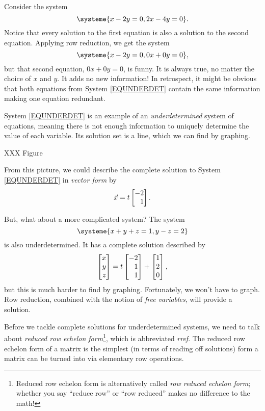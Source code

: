 	Consider the system
	\begin{equation}
		\label{EQUNDERDET}
		\systeme{x-2y=0,2x-4y=0}.
	\end{equation}
	Notice that every solution to the first equation is also a solution to the second equation.
	Applying row reduction, we get the system
	\[
		\systeme{x-2y=0,0x+0y=0},
	\]
	but that second equation, $0x+0y=0$, is funny. It is always true, no matter the choice of $x$ and $y$.
	It adds no new information! In retrospect, it might be obvious that both equations from System \eqref{EQUNDERDET}
	contain the same information making one equation redundant.

	System \eqref{EQUNDERDET} is an example of an \emph{underdetermined} system of equations, meaning 
	there is not enough information to uniquely determine the value of each variable.
	Its solution
	set is a line, which we can find by graphing.
	
	XXX Figure

	From this picture, we could describe the complete solution to System \eqref{EQUNDERDET} in \emph{vector form} by
	\[
		\vec x = t\mat{-2\\1}.
	\]

	But, what about a more complicated system? The system
	\[
		\systeme{x+y+z=1,y-z=2}
	\]
	is also underdetermined. It has a complete solution described by
	\[
		\mat{x\\y\\z} =t\mat{-2\\1\\1} + \mat{1\\2\\0},
	\]
	but this is much harder to find by graphing.
	Fortunately, we won't have to graph. Row reduction, combined with the notion of \emph{free variables},
	will provide a solution.

	Before we tackle complete solutions for underdetermined systems, we need to talk about \emph{reduced row echelon form}\footnote{
		Reduced row echelon form is alternatively called \emph{row reduced echelon form}; whether you say ``reduce row'' or 
		``row reduced'' makes no difference to the math!
	},
	which is abbreviated \emph{rref}.
	The reduced row echelon form of a matrix is the
	simplest (in terms of reading off solutions) form a matrix can be turned into via elementary row operations.

